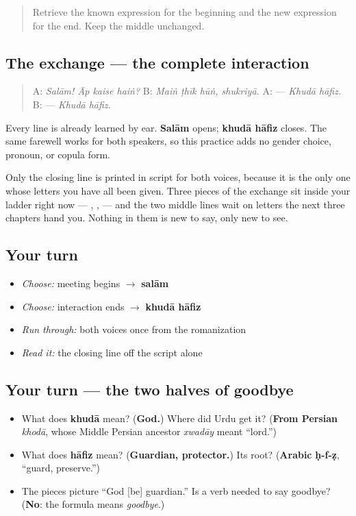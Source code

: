 \label{lesson:UR-C05-practice}



\begin{quote}
Retrieve the known expression for the beginning and the new expression for the end. Keep the middle unchanged.
\end{quote}

\subsection*{The exchange — the complete interaction}
\begin{quote}
A: \emph{Salām! Āp kaise haiṅ?} B: \emph{Maiṅ ṭhīk hūṅ, shukriyā.} A: \textbf{ } — \emph{Khudā hāfiz.} B: \textbf{ } — \emph{Khudā hāfiz.}
\end{quote}

Every line is already learned by ear. \textbf{Salām} opens; \textbf{khudā hāfiz} closes. The same farewell works for both speakers, so this practice adds no gender choice, pronoun, or copula form.

Only the closing line is printed in script for both voices, because it is the only one whose letters you have all been given. Three pieces of the exchange sit inside your ladder right now — \textbf{}, \textbf{}, \textbf{ } — and the two middle lines wait on letters the next three chapters hand you. Nothing in them is new to say, only new to see.

\subsection*{Your turn}
\begin{itemize}
\raggedright
  \item \emph{Choose:} meeting begins $\to$ \textbf{salām}
  \item \emph{Choose:} interaction ends $\to$ \textbf{khudā hāfiz}
  \item \emph{Run through:} both voices once from the romanization
  \item \emph{Read it:} the closing line off the script alone
\end{itemize}

\subsection*{Your turn — the two halves of goodbye}
\begin{itemize}
\raggedright
  \item What does \textbf{khudā} mean? (\textbf{God.}) Where did Urdu get it? (\textbf{From Persian} \emph{khodā}, whose Middle Persian ancestor \emph{xwadāy} meant \textquotedblleft{}lord.\textquotedblright{})
  \item What does \textbf{hāfiz} mean? (\textbf{Guardian, protector.}) Its root? (\textbf{Arabic} \textbf{ḥ-f-ẓ}, \textquotedblleft{}guard, preserve.\textquotedblright{})
  \item The pieces picture \textquotedblleft{}God {[}be{]} guardian.\textquotedblright{} Is a verb needed to say goodbye? (\textbf{No}: the formula means \emph{goodbye}.)
\end{itemize}

